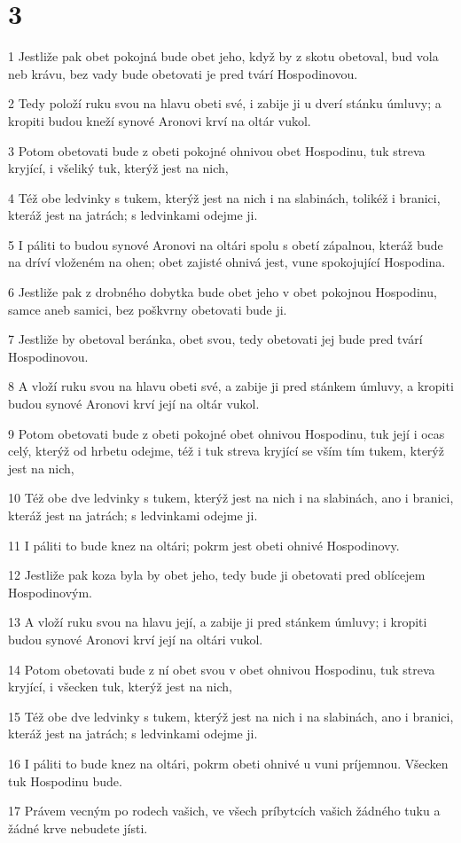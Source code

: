 \chapter{3}

\par 1 Jestliže pak obet pokojná bude obet jeho, když by z skotu obetoval, bud vola neb krávu, bez vady bude obetovati je pred tvárí Hospodinovou.
\par 2 Tedy položí ruku svou na hlavu obeti své, i zabije ji u dverí stánku úmluvy; a kropiti budou kneží synové Aronovi krví na oltár vukol.
\par 3 Potom obetovati bude z obeti pokojné ohnivou obet Hospodinu, tuk streva kryjící, i všeliký tuk, kterýž jest na nich,
\par 4 Též obe ledvinky s tukem, kterýž jest na nich i na slabinách, tolikéž i branici, kteráž jest na jatrách; s ledvinkami odejme ji.
\par 5 I páliti to budou synové Aronovi na oltári spolu s obetí zápalnou, kteráž bude na dríví vloženém na ohen; obet zajisté ohnivá jest, vune spokojující Hospodina.
\par 6 Jestliže pak z drobného dobytka bude obet jeho v obet pokojnou Hospodinu, samce aneb samici, bez poškvrny obetovati bude ji.
\par 7 Jestliže by obetoval beránka, obet svou, tedy obetovati jej bude pred tvárí Hospodinovou.
\par 8 A vloží ruku svou na hlavu obeti své, a zabije ji pred stánkem úmluvy, a kropiti budou synové Aronovi krví její na oltár vukol.
\par 9 Potom obetovati bude z obeti pokojné obet ohnivou Hospodinu, tuk její i ocas celý, kterýž od hrbetu odejme, též i tuk streva kryjící se vším tím tukem, kterýž jest na nich,
\par 10 Též obe dve ledvinky s tukem, kterýž jest na nich i na slabinách, ano i branici, kteráž jest na jatrách; s ledvinkami odejme ji.
\par 11 I páliti to bude knez na oltári; pokrm jest obeti ohnivé Hospodinovy.
\par 12 Jestliže pak koza byla by obet jeho, tedy bude ji obetovati pred oblícejem Hospodinovým.
\par 13 A vloží ruku svou na hlavu její, a zabije ji pred stánkem úmluvy; i kropiti budou synové Aronovi krví její na oltári vukol.
\par 14 Potom obetovati bude z ní obet svou v obet ohnivou Hospodinu, tuk streva kryjící, i všecken tuk, kterýž jest na nich,
\par 15 Též obe dve ledvinky s tukem, kterýž jest na nich i na slabinách, ano i branici, kteráž jest na jatrách; s ledvinkami odejme ji.
\par 16 I páliti to bude knez na oltári, pokrm obeti ohnivé u vuni príjemnou. Všecken tuk Hospodinu bude.
\par 17 Právem vecným po rodech vašich, ve všech príbytcích vašich žádného tuku a žádné krve nebudete jísti.

